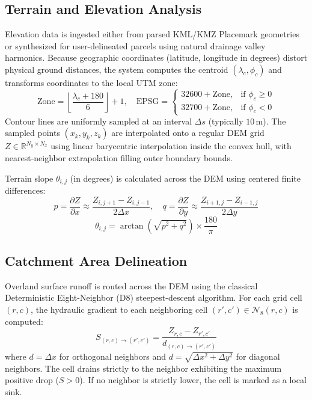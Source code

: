\documentclass[manuscript,screen,review]{acmart}
\begin{document}
\subsection{Terrain and Elevation Analysis}
Elevation data is ingested either from parsed KML/KMZ Placemark geometries or synthesized for user-delineated parcels using natural drainage valley harmonics. Because geographic coordinates (latitude, longitude in degrees) distort physical ground distances, the system computes the centroid $(\lambda_c, \phi_c)$ and transforms coordinates to the local UTM zone:
\begin{equation}
\text{Zone} = \left\lfloor \frac{\lambda_c + 180}{6} \right\rfloor + 1, \quad \text{EPSG} = 
\begin{cases} 
32600 + \text{Zone}, & \text{if } \phi_c \ge 0 \\
32700 + \text{Zone}, & \text{if } \phi_c < 0
\end{cases}
\end{equation}
Contour lines are uniformly sampled at an interval $\Delta s$ (typically $10$\,m). The sampled points $(x_k, y_k, z_k)$ are interpolated onto a regular DEM grid $Z \in \mathbb{R}^{N_y \times N_x}$ using linear barycentric interpolation inside the convex hull, with nearest-neighbor extrapolation filling outer boundary bounds.

Terrain slope $\theta_{i,j}$ (in degrees) is calculated across the DEM using centered finite differences:
\begin{equation}
p = \frac{\partial Z}{\partial x} \approx \frac{Z_{i, j+1} - Z_{i, j-1}}{2 \Delta x}, \quad 
q = \frac{\partial Z}{\partial y} \approx \frac{Z_{i+1, j} - Z_{i-1, j}}{2 \Delta y}
\end{equation}
\begin{equation}
\theta_{i,j} = \arctan\left( \sqrt{p^2 + q^2} \right) \times \frac{180}{\pi}
\end{equation}

\subsection{Catchment Area Delineation}
Overland surface runoff is routed across the DEM using the classical Deterministic Eight-Neighbor (D8) steepest-descent algorithm. For each grid cell $(r, c)$, the hydraulic gradient to each neighboring cell $(r', c') \in \mathcal{N}_8(r, c)$ is computed:
\begin{equation}
S_{(r,c) \to (r',c')} = \frac{Z_{r, c} - Z_{r', c'}}{d_{(r,c) \to (r', c')}}
\end{equation}
where $d = \Delta x$ for orthogonal neighbors and $d = \sqrt{\Delta x^2 + \Delta y^2}$ for diagonal neighbors. The cell drains strictly to the neighbor exhibiting the maximum positive drop ($S > 0$). If no neighbor is strictly lower, the cell is marked as a local sink.
\end{document}
